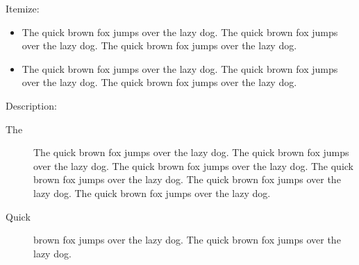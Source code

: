 \documentclass{article}
\begin{document}
Itemize:
\begin{itemize}
  \item The quick brown fox jumps over the lazy dog. The quick brown fox jumps over the lazy dog. The quick brown fox jumps over the lazy dog.
  \item The quick brown fox jumps over the lazy dog. The quick brown fox jumps over the lazy dog. The quick brown fox jumps over the lazy dog.
\end{itemize}


Description:
\begin{description}
  \item[The] The quick brown fox jumps over the lazy dog. The quick brown fox jumps over the lazy dog. The quick brown fox jumps over the lazy dog. The quick brown fox jumps over the lazy dog. The quick brown fox jumps over the lazy dog. The quick brown fox jumps over the lazy dog.
  \item[Quick] brown fox jumps over the lazy dog.  The quick brown fox jumps over the lazy dog.
\end{description}
\end{document}
